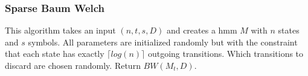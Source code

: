 \subsubsection{Sparse Baum Welch}
This algorithm takes an input $(n, t, s, D)$ and creates a \gls{hmm} $M$ with $n$ states and $s$ symbols.
All parameters are initialized randomly but with the constraint that each state has exactly $\lceil log(n) \rceil$ outgoing transitions.
Which transitions to discard are chosen randomly.
Return $BW(M_t, D)$.